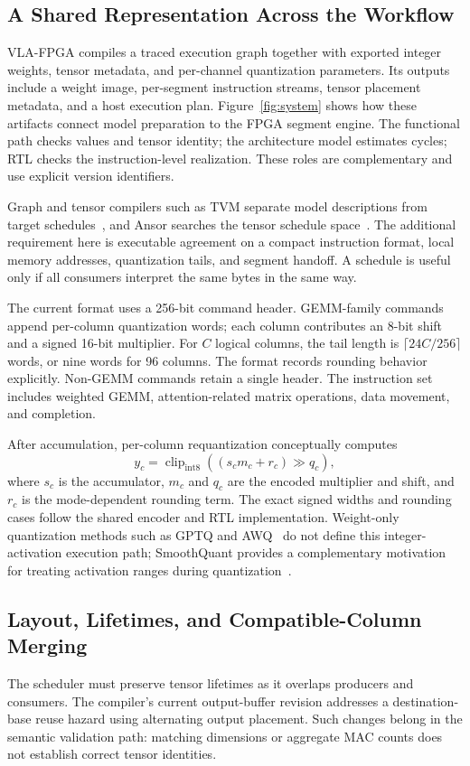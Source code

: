 \documentclass[10pt,conference,letterpaper]{IEEEtran}
\begin{document}
\subsection{A Shared Representation Across the Workflow}
VLA-FPGA compiles a traced execution graph together with exported integer weights, tensor metadata, and per-channel quantization parameters. Its outputs include a weight image, per-segment instruction streams, tensor placement metadata, and a host execution plan. Figure~\ref{fig:system} shows how these artifacts connect model preparation to the FPGA segment engine. The functional path checks values and tensor identity; the architecture model estimates cycles; RTL checks the instruction-level realization. These roles are complementary and use explicit version identifiers.

Graph and tensor compilers such as TVM separate model descriptions from target schedules~\cite{tvm}, and Ansor searches the tensor schedule space~\cite{ansor}. The additional requirement here is executable agreement on a compact instruction format, local memory addresses, quantization tails, and segment handoff. A schedule is useful only if all consumers interpret the same bytes in the same way.

The current format uses a 256-bit command header. GEMM-family commands append per-column quantization words; each column contributes an 8-bit shift and a signed 16-bit multiplier. For $C$ logical columns, the tail length is $\lceil24C/256\rceil$ words, or nine words for 96 columns. The format records rounding behavior explicitly. Non-GEMM commands retain a single header. The instruction set includes weighted GEMM, attention-related matrix operations, data movement, and completion.

After accumulation, per-column requantization conceptually computes
\begin{equation}
y_c=\operatorname{clip}_{\mathrm{int8}}\!\left((s_c m_c+r_c)\mathbin{\gg}q_c\right),
\end{equation}
where $s_c$ is the accumulator, $m_c$ and $q_c$ are the encoded multiplier and shift, and $r_c$ is the mode-dependent rounding term. The exact signed widths and rounding cases follow the shared encoder and RTL implementation. Weight-only quantization methods such as GPTQ and AWQ~\cite{gptq,awq} do not define this integer-activation execution path; SmoothQuant provides a complementary motivation for treating activation ranges during quantization~\cite{smooth}.

\subsection{Layout, Lifetimes, and Compatible-Column Merging}
The scheduler must preserve tensor lifetimes as it overlaps producers and consumers. The compiler's current output-buffer revision addresses a destination-base reuse hazard using alternating output placement. Such changes belong in the semantic validation path: matching dimensions or aggregate MAC counts does not establish correct tensor identities.
\end{document}

